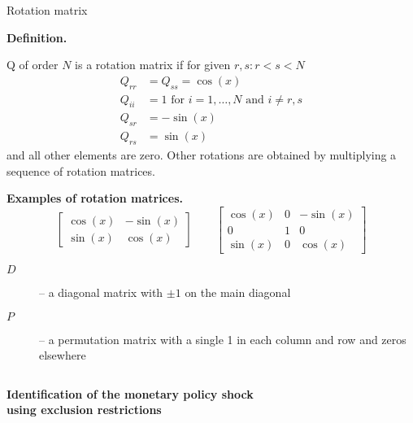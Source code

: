 \documentclass[notes,blackandwhite,mathsans,usenames,dvipsnames]{beamer}
\begin{document}
\begin{frame}{Rotation matrix}

\textbf{Definition.}\small

 Q {\color{mcxs2}of order} $N$ {\color{mcxs2}is a rotation matrix if for given} $r,s:r<s<N$\small
\begin{align*}
Q_{rr} &= Q_{ss} = \cos(x)\\
Q_{ii} &= 1\text{ for }i=1,\dots,N\text{ and } i\neq r,s\\
Q_{sr} &= -\sin(x)\\
Q_{rs} &= \sin(x)
\end{align*}\normalsize
{\color{mcxs2}and all other elements are zero. Other rotations are obtained by multiplying a sequence of rotation matrices.}

\bigskip\normalsize\textbf{Examples of rotation matrices.}\small
$$\begin{bmatrix} \cos(x) &-\sin(x) \\ \sin(x) & \cos(x) \end{bmatrix} \qquad \begin{bmatrix} \cos(x)&0 &-\sin(x)\\ 0&1&0 \\ \sin(x) &0& \cos(x) \end{bmatrix} $$

\begin{description}
\item[$D$] {\color{mcxs2}-- a diagonal matrix with} $\pm1$ {\color{mcxs2}on the main diagonal}
\item[$P$] {\color{mcxs2}-- a permutation matrix with a single} 1 {\color{mcxs2}in each column and row and zeros elsewhere}
\item[$$]
\end{description}

\end{frame}






{
\begin{frame}

\begin{adjustwidth}{-0.5cm}{0cm}
\vspace{7.8cm}\Large
\textbf{{\color{mcxs5}Identification of the} {\color{mcxs1}monetary policy shock}}\\
\textbf{\color{mcxs5}using exclusion restrictions}
\end{adjustwidth}

\end{frame}
}
\end{document}
